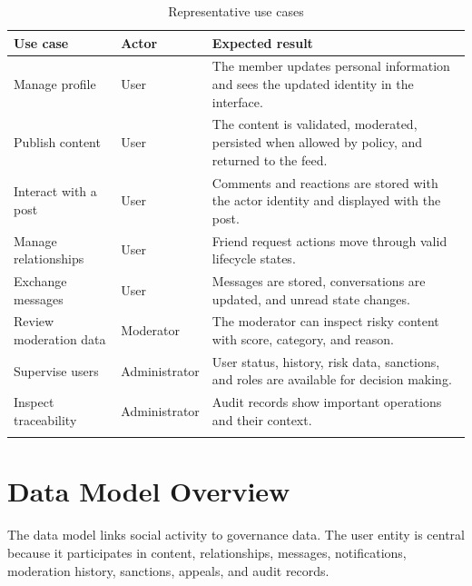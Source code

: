 \begin{longtable}{|m{3.5cm}|m{2.8cm}|m{7.4cm}|}
\hline
\textbf{Use case} & \textbf{Actor} & \textbf{Expected result} \\
\hline
Manage profile & User & The member updates personal information and sees the updated identity in the interface. \\
\hline
Publish content & User & The content is validated, moderated, persisted when allowed by policy, and returned to the feed. \\
\hline
Interact with a post & User & Comments and reactions are stored with the actor identity and displayed with the post. \\
\hline
Manage relationships & User & Friend request actions move through valid lifecycle states. \\
\hline
Exchange messages & User & Messages are stored, conversations are updated, and unread state changes. \\
\hline
Review moderation data & Moderator & The moderator can inspect risky content with score, category, and reason. \\
\hline
Supervise users & Administrator & User status, history, risk data, sanctions, and roles are available for decision making. \\
\hline
Inspect traceability & Administrator & Audit records show important operations and their context. \\
\hline
\caption{Representative use cases}
\end{longtable}

\section{Data Model Overview}

The data model links social activity to governance data. The user entity is central because it participates in content, relationships, messages, notifications, moderation history, sanctions, appeals, and audit records.

